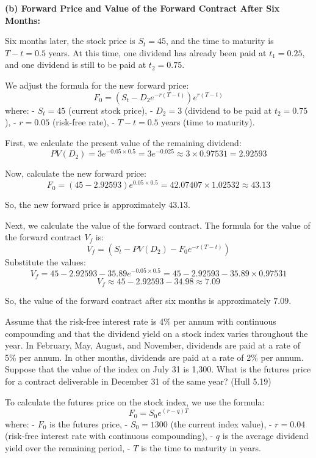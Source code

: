 \documentclass[12pt,letterpaper, onecolumn]{exam}
\begin{document}
\begin{questions}
\begin{solution}
\textbf{(b) Forward Price and Value of the Forward Contract After Six Months:}

Six months later, the stock price is \( S_t = 45 \), and the time to maturity is \( T - t = 0.5 \) years. At this time, one dividend has already been paid at \( t_1 = 0.25 \), and one dividend is still to be paid at \( t_2 = 0.75 \). 

We adjust the formula for the new forward price:
\[
F_0 = \left(S_t - D_2 e^{-r(T-t)}\right) e^{r(T-t)}
\]
where:
- \( S_t = 45 \) (current stock price),
- \( D_2 = 3 \) (dividend to be paid at \( t_2 = 0.75 \)),
- \( r = 0.05 \) (risk-free rate),
- \( T-t = 0.5 \) years (time to maturity).

First, we calculate the present value of the remaining dividend:
\[
PV(D_2) = 3 e^{-0.05 \times 0.5} = 3 e^{-0.025} \approx 3 \times 0.97531 = 2.92593
\]

Now, calculate the new forward price:
\[
F_0 = \left(45 - 2.92593\right) e^{0.05 \times 0.5} = 42.07407 \times 1.02532 \approx 43.13
\]

So, the new forward price is approximately \( 43.13 \).

Next, we calculate the value of the forward contract. The formula for the value of the forward contract \( V_f \) is:
\[
V_f = (S_t - PV(D_2) - F_0 e^{-r(T-t)})
\]
Substitute the values:
\[
V_f = 45 - 2.92593 - 35.89 e^{-0.05 \times 0.5} = 45 - 2.92593 - 35.89 \times 0.97531
\]
\[
V_f \approx 45 - 2.92593 - 34.98 \approx 7.09
\]

So, the value of the forward contract after six months is approximately \( 7.09 \).

\end{solution}


    \pagebreak %
    
    \question Assume that the risk-free interest rate is 4\% per annum with continuous compounding
and that the dividend yield on a stock index varies throughout the year. In February, May,
August, and November, dividends are paid at a rate of 5\% per annum. In other months,
dividends are paid at a rate of 2\% per annum. Suppose that the value of the index on July
31 is 1,300. What is the futures price for a contract deliverable in December 31 of the
same year? (Hull 5.19)
    

    \begin{solution}

To calculate the futures price on the stock index, we use the formula:
\[
F_0 = S_0 e^{(r - q)T}
\]
where:
- \( F_0 \) is the futures price,
- \( S_0 = 1300 \) (the current index value),
- \( r = 0.04 \) (risk-free interest rate with continuous compounding),
- \( q \) is the average dividend yield over the remaining period,
- \( T \) is the time to maturity in years.


\end{solution}
\end{questions}
\end{document}
